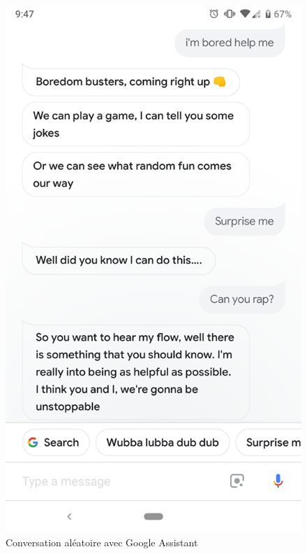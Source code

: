 \begin{figure}[H] 
	\captionsetup{justification=centering} 
	\begin{minipage}[b]{.45\textwidth}
		\centering
		\includegraphics[width=.85\linewidth]{images/google_assitant/bored.png} 
		\caption{Conversation aléatoire avec Google Assistant}
		\label{fig:boredpic}
		

\end{minipage}
\end{figure}
